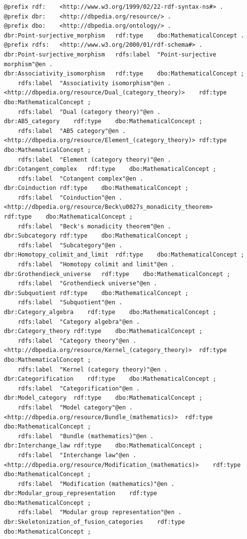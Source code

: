 \begin{verbatim}
@prefix rdf:	<http://www.w3.org/1999/02/22-rdf-syntax-ns#> .
@prefix dbr:	<http://dbpedia.org/resource/> .
@prefix dbo:	<http://dbpedia.org/ontology/> .
dbr:Point-surjective_morphism	rdf:type	dbo:MathematicalConcept .
@prefix rdfs:	<http://www.w3.org/2000/01/rdf-schema#> .
dbr:Point-surjective_morphism	rdfs:label	"Point-surjective morphism"@en .
dbr:Associativity_isomorphism	rdf:type	dbo:MathematicalConcept ;
	rdfs:label	"Associativity isomorphism"@en .
<http://dbpedia.org/resource/Dual_(category_theory)>	rdf:type	dbo:MathematicalConcept ;
	rdfs:label	"Dual (category theory)"@en .
dbr:AB5_category	rdf:type	dbo:MathematicalConcept ;
	rdfs:label	"AB5 category"@en .
<http://dbpedia.org/resource/Element_(category_theory)>	rdf:type	dbo:MathematicalConcept ;
	rdfs:label	"Element (category theory)"@en .
dbr:Cotangent_complex	rdf:type	dbo:MathematicalConcept ;
	rdfs:label	"Cotangent complex"@en .
dbr:Coinduction	rdf:type	dbo:MathematicalConcept ;
	rdfs:label	"Coinduction"@en .
<http://dbpedia.org/resource/Beck\u0027s_monadicity_theorem>	rdf:type	dbo:MathematicalConcept ;
	rdfs:label	"Beck's monadicity theorem"@en .
dbr:Subcategory	rdf:type	dbo:MathematicalConcept ;
	rdfs:label	"Subcategory"@en .
dbr:Homotopy_colimit_and_limit	rdf:type	dbo:MathematicalConcept ;
	rdfs:label	"Homotopy colimit and limit"@en .
dbr:Grothendieck_universe	rdf:type	dbo:MathematicalConcept ;
	rdfs:label	"Grothendieck universe"@en .
dbr:Subquotient	rdf:type	dbo:MathematicalConcept ;
	rdfs:label	"Subquotient"@en .
dbr:Category_algebra	rdf:type	dbo:MathematicalConcept ;
	rdfs:label	"Category algebra"@en .
dbr:Category_theory	rdf:type	dbo:MathematicalConcept ;
	rdfs:label	"Category theory"@en .
<http://dbpedia.org/resource/Kernel_(category_theory)>	rdf:type	dbo:MathematicalConcept ;
	rdfs:label	"Kernel (category theory)"@en .
dbr:Categorification	rdf:type	dbo:MathematicalConcept ;
	rdfs:label	"Categorification"@en .
dbr:Model_category	rdf:type	dbo:MathematicalConcept ;
	rdfs:label	"Model category"@en .
<http://dbpedia.org/resource/Bundle_(mathematics)>	rdf:type	dbo:MathematicalConcept ;
	rdfs:label	"Bundle (mathematics)"@en .
dbr:Interchange_law	rdf:type	dbo:MathematicalConcept ;
	rdfs:label	"Interchange law"@en .
<http://dbpedia.org/resource/Modification_(mathematics)>	rdf:type	dbo:MathematicalConcept ;
	rdfs:label	"Modification (mathematics)"@en .
dbr:Modular_group_representation	rdf:type	dbo:MathematicalConcept ;
	rdfs:label	"Modular group representation"@en .
dbr:Skeletonization_of_fusion_categories	rdf:type	dbo:MathematicalConcept ;

\end{verbatim}
